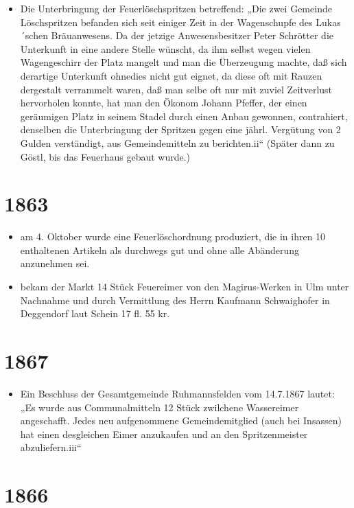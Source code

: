 \documentclass[12pt,a4paper]{book}
\begin{document}
\begin{itemize}
\item Die Unterbringung der Feuerlöschspritzen betreffend: „Die zwei
Gemeinde Löschspritzen befanden sich seit einiger Zeit in der
Wagenschupfe des Lukas´schen Bräuanwesens. Da der jetzige
Anwesensbesitzer Peter Schrötter die Unterkunft in eine andere Stelle
wünscht, da ihm selbst wegen vielen Wagengeschirr der Platz mangelt und
man die Überzeugung machte, daß sich derartige Unterkunft ohnedies nicht
gut eignet, da diese oft mit Rauzen dergestalt verrammelt waren, daß man
selbe oft nur mit zuviel Zeitverlust hervorholen konnte, hat man den
Ökonom Johann Pfeffer, der einen geräumigen Platz in seinem Stadel durch
einen Anbau gewonnen, contrahiert, denselben die Unterbringung der
Spritzen gegen eine jährl. Vergütung von 2 Gulden verständigt, aus
Gemeindemitteln zu berichten.ii“ (Später dann zu Göstl, bis das
Feuerhaus gebaut wurde.)
\end{itemize}

\section*{1863}

\begin{itemize}
\item am 4. Oktober wurde eine Feuerlöschordnung produziert, die in
ihren 10 enthaltenen Artikeln als durchwegs gut und ohne alle Abänderung
anzunehmen sei.

\item bekam der Markt 14 Stück Feuereimer von den Magirus-Werken in Ulm
unter Nachnahme und durch Vermittlung des Herrn Kaufmann Schwaighofer in
Deggendorf laut Schein 17 fl. 55 kr.
\end{itemize}

\section*{1867}

\begin{itemize}
\item Ein Beschluss der Gesamtgemeinde Ruhmannsfelden vom 14.7.1867
lautet: „Es wurde aus Communalmitteln 12 Stück zwilchene Wassereimer
angeschafft. Jedes neu aufgenommene Gemeindemitglied (auch bei Insassen)
hat einen desgleichen Eimer anzukaufen und an den Spritzenmeister
abzuliefern.iii“
\end{itemize}

\section*{1866}
\end{document}
